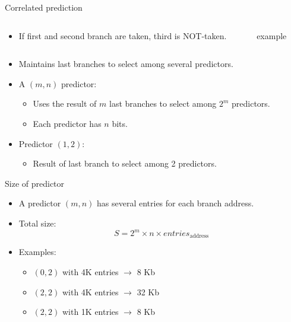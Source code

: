 \begin{frame}[t]{Correlated prediction}

\begin{columns}

\begin{column}{.7\textwidth}
\begin{itemize}
  \item If first and second branch are taken, third is NOT-taken.
\end{itemize}
\end{column}

\begin{column}{.3\textwidth}
\begin{block}{example}

\end{block}
\end{column}
\end{columns}

\begin{itemize}
  \item Maintains last branches  to select among several
        predictors.
  \item A $(m,n)$ predictor:
    \begin{itemize}
      \item Uses the result of $m$ last branches to select among
            $2^m$ predictors.
      \item Each predictor has $n$ bits.
    \end{itemize}
  \item Predictor $(1,2)$:
    \begin{itemize}
      \item Result of last branch to select among 2 predictors.
    \end{itemize}
\end{itemize}
\end{frame}

\begin{frame}[t]{Size of predictor}
\begin{itemize}
  \item A predictor $(m,n)$ has several entries for each branch address.

  \item Total size:
\[
S = 2^m \times n \times entries_{\text{address}}
\]

  \item Examples:
    \begin{itemize}
      \item $(0,2)$ with 4K entries $\rightarrow$ 8 Kb
      \item $(2,2)$ with 4K entries $\rightarrow$ 32 Kb
      \item $(2,2)$ with 1K entries $\rightarrow$ 8 Kb
   \end{itemize}
\end{itemize}
\end{frame}

